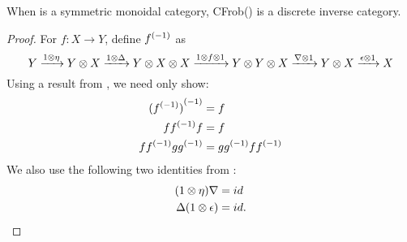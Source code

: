 \begin{theorem}
  When \X is a symmetric monoidal category, CFrob(\X) is a discrete inverse category.
\end{theorem}
\begin{proof}
  For $f:X \to Y$, define ${f}^{(-1)}$ as
  \[
    Y \xrightarrow{1\otimes\eta} Y\otimes X \xrightarrow{1\otimes\Delta}
      Y\otimes X\otimes X \xrightarrow{1\otimes f\otimes1} Y\otimes Y\otimes X \xrightarrow{\nabla\otimes1}
      Y\otimes X \xrightarrow{\epsilon\otimes1}X
  \]
  Using a result from \cite{cockett2002:restcategories1}, we need only show:
  \begin{align*}
    {(\ensuremath{{f}^{(-1)}})}^{(-1)} &= f\\
    f{f}^{(-1)}f &= f\\
    f{f}^{(-1)}g{g}^{(-1)} &=g{g}^{(-1)} f{f}^{(-1)}
  \end{align*}
  We also use the following two identities from \cite{kock04}:
  \begin{align}
    (1\otimes\eta)\nabla &= id\\
    \Delta(1\otimes\epsilon) &= id.
  \end{align}


\end{proof}
